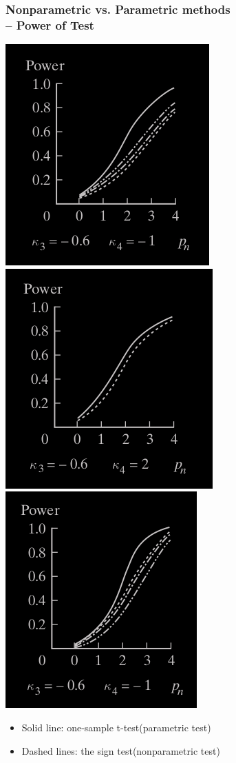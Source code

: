 \begin{frame}
	\frametitle{Nonparametric vs. Parametric methods \\ \small -- Power of Test}
\begin{center}
	\includegraphics[scale=0.25]{Codes/nonparametric_power1.png}
	\includegraphics[scale=0.25]{Codes/nonparametric_power2.png}
	\includegraphics[scale=0.25]{Codes/nonparametric_power3.png}
\end{center}
\vfill

\begin{itemize}
	\item Solid line: one-sample t-test\hfill (parametric test)\\[1em]
	\item Dashed lines: the sign test\hfill (nonparametric test)
\end{itemize}
\end{frame}
